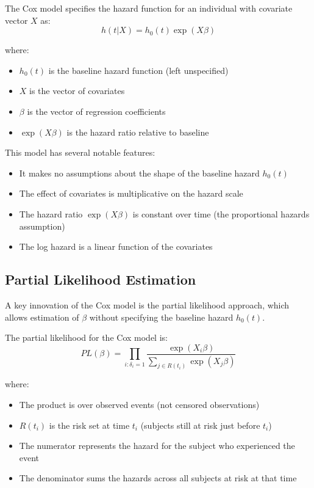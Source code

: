 \begin{definitionbox}[title=Cox Proportional Hazards Model]
The Cox model specifies the hazard function for an individual with covariate vector $X$ as:
\begin{equation}
    h(t|X) = h_0(t) \exp(X\beta)
\end{equation}

where:
\begin{itemize}
    \item $h_0(t)$ is the baseline hazard function (left unspecified)
    \item $X$ is the vector of covariates
    \item $\beta$ is the vector of regression coefficients
    \item $\exp(X\beta)$ is the hazard ratio relative to baseline
\end{itemize}
\end{definitionbox}

This model has several notable features:
\begin{itemize}
    \item It makes no assumptions about the shape of the baseline hazard $h_0(t)$
    \item The effect of covariates is multiplicative on the hazard scale
    \item The hazard ratio $\exp(X\beta)$ is constant over time (the proportional hazards assumption)
    \item The log hazard is a linear function of the covariates
\end{itemize}

\subsection{Partial Likelihood Estimation}

A key innovation of the Cox model is the partial likelihood approach, which allows estimation of $\beta$ without specifying the baseline hazard $h_0(t)$.

\begin{definitionbox}[title=Partial Likelihood]
The partial likelihood for the Cox model is:
\begin{equation}
    PL(\beta) = \prod_{i: \delta_i=1} \frac{\exp(X_i\beta)}{\sum_{j \in R(t_i)}\exp(X_j\beta)}
\end{equation}

where:
\begin{itemize}
    \item The product is over observed events (not censored observations)
    \item $R(t_i)$ is the risk set at time $t_i$ (subjects still at risk just before $t_i$)
    \item The numerator represents the hazard for the subject who experienced the event
    \item The denominator sums the hazards across all subjects at risk at that time
\end{itemize}
\end{definitionbox}

